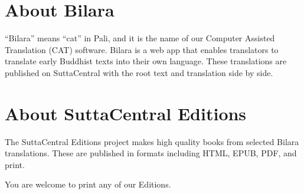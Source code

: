 \documentclass[12pt,openany]{book}%
\begin{document}
\section*{About Bilara}

“Bilara” means “cat” in Pali, and it is the name of our Computer Assisted Translation (CAT) software. Bilara is a web app that enables translators to translate early Buddhist texts into their own language. These translations are published on SuttaCentral with the root text and translation side by side.

\section*{About SuttaCentral Editions}

The SuttaCentral Editions project makes high quality books from selected Bilara translations. These are published in formats including HTML, EPUB, PDF, and print.

You are welcome to print any of our Editions.

%
\end{document}
